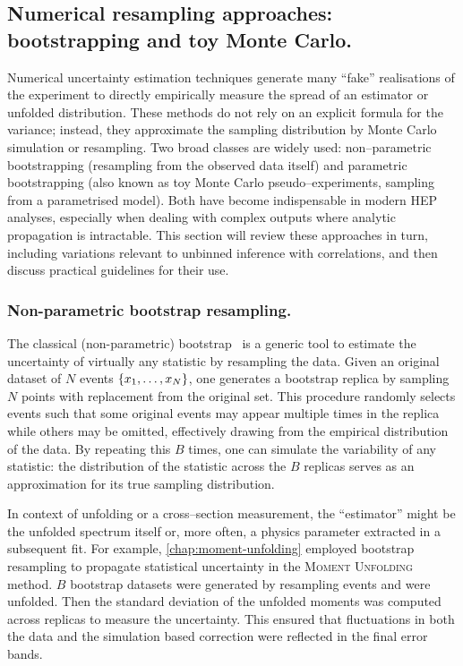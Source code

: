     \subsection{Numerical resampling approaches: bootstrapping and toy Monte Carlo.}
        Numerical uncertainty estimation techniques generate many ``fake'' realisations of the experiment to directly empirically measure the spread of an estimator or unfolded distribution.
        These methods do not rely on an explicit formula for the variance; instead, they approximate the sampling distribution by Monte Carlo simulation or resampling. 
        Two broad classes are widely used: non--parametric bootstrapping (resampling from the observed data itself) and parametric bootstrapping (also known as toy Monte Carlo pseudo--experiments, sampling from a parametrised model).
        Both have become indispensable in modern HEP analyses, especially when dealing with complex outputs where analytic propagation is intractable.
        This section will review these approaches in turn, including variations relevant to unbinned inference with correlations, and then discuss practical guidelines for their use.
        \subsubsection{Non-parametric bootstrap resampling.}
            The classical (non-parametric) bootstrap~\cite{zivot_86_2025} is a generic tool to estimate the uncertainty of virtually any statistic by resampling the data.
            Given an original dataset of $N$ events $\qty{x_1,\dots,x_N}$, one generates a bootstrap replica by sampling $N$ points with replacement from the original set.
            This procedure randomly selects events such that some original events may appear multiple times in the replica while others may be omitted, effectively drawing from the empirical distribution of the data.
            By repeating this $B$ times, one can simulate the variability of any statistic: the distribution of the statistic across the $B$ replicas serves as an approximation for its true sampling distribution.
            
            In context of unfolding or a cross--section measurement, the ``estimator'' might be the unfolded spectrum itself or, more often, a physics parameter extracted in a subsequent fit.
            For example, \cref{chap:moment-unfolding} employed bootstrap resampling to propagate statistical uncertainty in the \textsc{Moment Unfolding} method.
            $B$ bootstrap datasets were generated by resampling events and were unfolded.
            Then the standard deviation of the unfolded moments was computed across replicas to measure the uncertainty.
            This ensured that fluctuations in both the data and the simulation based correction were reflected in the final error bands.

